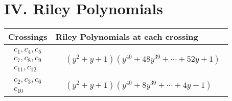 \documentclass[1p]{elsarticle_modified}
\theoremstyle{definition}
\begin{document}
\centering \section*{ IV. Riley Polynomials}
\begin{tabular}{m{50pt}|m{274pt}}
Crossings & \hspace{64pt}Riley Polynomials at each crossing \\
\hline $$\begin{aligned}c_{1},c_{4},c_{5}\\c_{7},c_{8},c_{9}\\c_{11},c_{12}\end{aligned}$$&$\begin{aligned}
&(y^2+y+1)(y^{40}+48 y^{39}+\cdots+52 y+1)
\end{aligned}$\\
\hline $$\begin{aligned}c_{2},c_{3},c_{6}\\c_{10}\end{aligned}$$&$\begin{aligned}
&(y^2+y+1)(y^{40}+8 y^{39}+\cdots+4 y+1)
\end{aligned}$\\
\hline
\end{tabular}
\vskip 2pc
\end{document}
